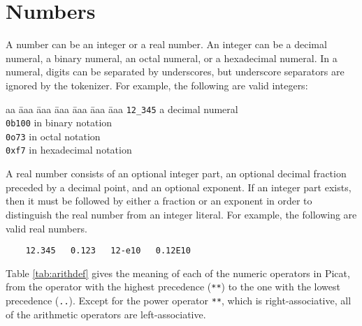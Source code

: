 \section{Numbers}
A number can be an integer or a real number. An integer can be a decimal numeral, a binary numeral, an octal numeral, or a hexadecimal numeral. In a numeral, digits can be separated by underscores, but underscore separators are ignored by the tokenizer. For example, the following are valid integers:
\begin{tabbing}
aa \= aaa \= aaa \= aaa \= aaa \= aaa \= aaa \kill
\> \texttt{12\_345} \> \> \> a decimal numeral \\
\> \texttt{0b100} \> \>  in binary notation  \\
\> \texttt{0o73} \> \>  in octal notation \\
\> \texttt{0xf7} \> \>  in hexadecimal notation  
\end{tabbing}

A real number consists of an optional integer part, an optional decimal fraction preceded by a decimal point, and an optional exponent. If an integer part exists, then it must be followed by either a fraction or an exponent in order to distinguish the real number from an integer literal. For example, the following are valid real numbers.
\begin{verbatim}
    12.345   0.123   12-e10   0.12E10
\end{verbatim}

Table \ref{tab:arithdef} gives the meaning of each of the numeric operators in Picat, from the operator with the highest precedence (\verb+**+) to the one with the lowest precedence (\verb+..+). Except for the power operator \verb+**+, which is right-associative, all of the arithmetic operators are left-associative. 

